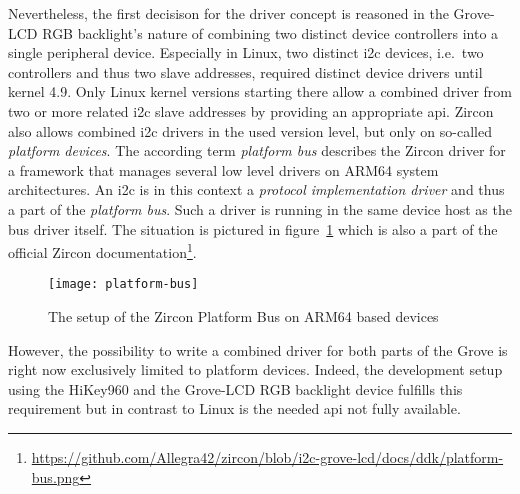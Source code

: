 Nevertheless, the first decisison for the driver concept is reasoned in the Grove-LCD RGB backlight's nature of combining two distinct device controllers into a single peripheral device.
Especially in Linux, two distinct \ac{i2c} devices, i.e.\ two controllers and thus two slave addresses, required distinct device drivers until kernel 4.9.
Only Linux kernel versions starting there allow a combined driver from two or more related \ac{i2c} slave addresses by providing an appropriate \ac{api}.
Zircon also allows combined \ac{i2c} drivers in the used version level, but only on so-called \textit{platform devices}.
The according term \textit{platform bus} describes the Zircon driver for a framework that manages several low level drivers on ARM64 system architectures.
An \ac{i2c} is in this context a \textit{protocol implementation driver} and thus a part of the \textit{platform bus}.
Such a driver is running in the same device host as the bus driver itself\cite{zircon-platformbus}.
The situation is pictured in figure~\ref{pic:platformbus} which is also a part of the official Zircon documentation\footnote{\url{https://github.com/Allegra42/zircon/blob/i2c-grove-lcd/docs/ddk/platform-bus.png}}\cite{zircon-platformbus}.

\begin{figure} [t]
    \centering
    \texttt{[image: platform-bus]}
    \caption{The setup of the Zircon Platform Bus on ARM64 based devices\cite{zircon-platformbus}}\label{pic:platformbus}
\end{figure} 

However, the possibility to write a combined driver for both parts of the Grove is right now exclusively limited to platform devices.
Indeed, the development setup using the HiKey960 and the Grove-LCD RGB backlight device fulfills this requirement but in contrast to Linux is the needed \ac{api} not fully available.

